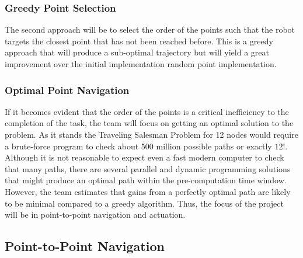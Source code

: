\documentclass[12pt,conference,onecolumn]{IEEEtran} %
\begin{document}
\subsubsection{Greedy Point Selection}
The second approach will be to select the order of the points such that the robot targets the closest point that has not been reached before. This is a greedy approach that will produce a sub-optimal trajectory but will yield a great improvement over the initial implementation random point implementation.
\subsubsection{Optimal Point Navigation}
If it becomes evident that the order of the points is a critical inefficiency to the completion of the task, the team will focus on getting an optimal solution to the problem. As it stands the Traveling Salesman Problem for 12 nodes would require a brute-force program to check about 500 million possible paths or exactly $12!$. Although it is not reasonable to expect even a fast modern computer to check that many paths, there are several parallel and dynamic programming solutions that might produce an optimal path within the pre-computation time window. However, the team estimates that gains from a perfectly optimal path are likely to be minimal compared to a greedy algorithm. Thus, the focus of the project will be in point-to-point navigation and actuation.


\subsection{Point-to-Point Navigation}
\end{document}
